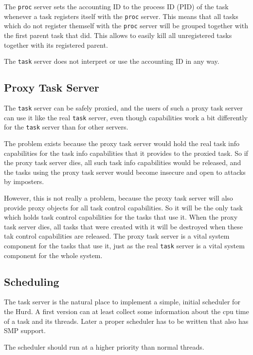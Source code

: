 \documentclass[9pt,a4paper]{extarticle}
\begin{document}
The \texttt{proc} server sets the accounting ID to the process ID
(PID) of the task whenever a task registers itself with the
\texttt{proc} server.  This means that all tasks which do not register
themself with the \texttt{proc} server will be grouped together with
the first parent task that did.  This allows to easily kill all
unregistered tasks together with its registered parent.

The \texttt{task} server does not interpret or use the accounting ID
in any way.


\subsection{Proxy Task Server}
\label{proxytaskserver}

The \texttt{task} server can be safely proxied, and the users of such
a proxy task server can use it like the real \texttt{task} server,
even though capabilities work a bit differently for the \texttt{task}
server than for other servers.

The problem exists because the proxy task server would hold the real
task info capabilities for the task info capabilities that it provides
to the proxied task.  So if the proxy task server dies, all such task
info capabilities would be released, and the tasks using the proxy
task server would become insecure and open to attacks by imposters.

However, this is not really a problem, because the proxy task server
will also provide proxy objects for all task control capabilities.  So
it will be the only task which holds task control capabilities for the
tasks that use it.  When the proxy task server dies, all tasks that
were created with it will be destroyed when these tak control
capabilities are released.  The proxy task server is a vital system
component for the tasks that use it, just as the real \texttt{task}
server is a vital system component for the whole system.


\subsection{Scheduling}

The task server is the natural place to implement a simple, initial
scheduler for the Hurd.  A first version can at least collect some
information about the cpu time of a task and its threads.  Later a
proper scheduler has to be written that also has SMP support.

The scheduler should run at a higher priority than normal threads.
\end{document}
